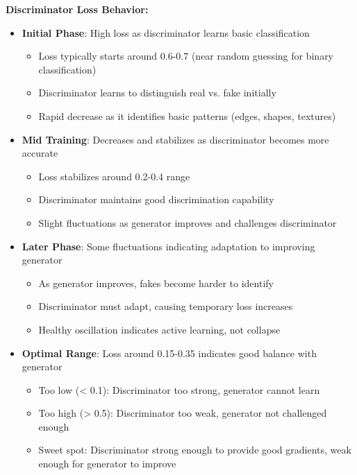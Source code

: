 \documentclass[conference,12pt]{IEEEtran}
\begin{document}
\textbf{Discriminator Loss Behavior:}
\begin{itemize}
    \item \textbf{Initial Phase}: High loss as discriminator learns basic classification
    \begin{itemize}
        \item Loss typically starts around 0.6-0.7 (near random guessing for binary classification)
        \item Discriminator learns to distinguish real vs. fake initially
        \item Rapid decrease as it identifies basic patterns (edges, shapes, textures)
    \end{itemize}
    \item \textbf{Mid Training}: Decreases and stabilizes as discriminator becomes more accurate
    \begin{itemize}
        \item Loss stabilizes around 0.2-0.4 range
        \item Discriminator maintains good discrimination capability
        \item Slight fluctuations as generator improves and challenges discriminator
    \end{itemize}
    \item \textbf{Later Phase}: Some fluctuations indicating adaptation to improving generator
    \begin{itemize}
        \item As generator improves, fakes become harder to identify
        \item Discriminator must adapt, causing temporary loss increases
        \item Healthy oscillation indicates active learning, not collapse
    \end{itemize}
    \item \textbf{Optimal Range}: Loss around 0.15-0.35 indicates good balance with generator
    \begin{itemize}
        \item Too low (< 0.1): Discriminator too strong, generator cannot learn
        \item Too high (> 0.5): Discriminator too weak, generator not challenged enough
        \item Sweet spot: Discriminator strong enough to provide good gradients, weak enough for generator to improve
    \end{itemize}
\end{itemize}
\end{document}
